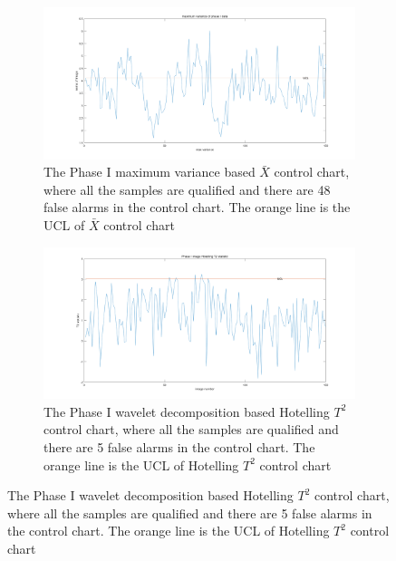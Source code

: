 \begin{figure}
    \centering
    \begin{subfigure}{\textwidth}
         \centering
         \includegraphics[width=\textwidth]{images/phaseI_max.png}
         \caption{The Phase I maximum variance based $\bar{X}$ control chart, where all the samples are qualified and there are 48 false alarms in the control chart. The orange line is the UCL of $\bar{X}$ control chart}
        \label{fig:phasI_methodI}
    \end{subfigure}
     
    \begin{subfigure}{\textwidth}
         \centering
         \includegraphics[width=\textwidth]{images/phaseI_t2.png}
         \caption{The Phase I wavelet decomposition based Hotelling $T^{2}$ control chart, where all the samples are qualified and there are 5 false alarms in the control chart. The orange line is the UCL of Hotelling $T^{2}$ control chart}
        \label{fig:phasI_methodII}
    \end{subfigure}
\end{figure}

